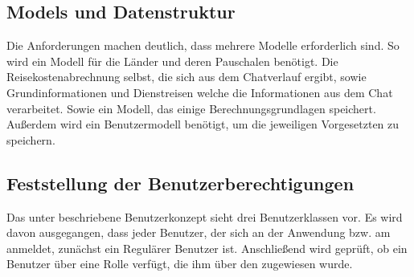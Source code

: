 \subsection{Models und Datenstruktur}

Die Anforderungen machen deutlich, dass mehrere Modelle erforderlich sind. So wird ein Modell für die Länder und deren Pauschalen benötigt. Die Reisekostenabrechnung selbst, die sich aus dem Chatverlauf ergibt, sowie Grundinformationen und Dienstreisen welche die Informationen aus dem Chat verarbeitet. Sowie ein Modell, das einige Berechnungsgrundlagen speichert. Außerdem wird ein Benutzermodell benötigt, um die jeweiligen Vorgesetzten zu speichern.

\subsection{Feststellung der Benutzerberechtigungen}
\label{sec:Planungsphase:Benutzerberechtigungen}

Das unter  beschriebene Benutzerkonzept sieht drei Benutzerklassen vor. Es wird davon ausgegangen, dass jeder Benutzer, der sich an der Anwendung bzw. am  anmeldet, zunächst ein Regulärer Benutzer ist. Anschließend wird geprüft, ob ein Benutzer über eine Rolle verfügt, die ihm über den  zugewiesen wurde.
